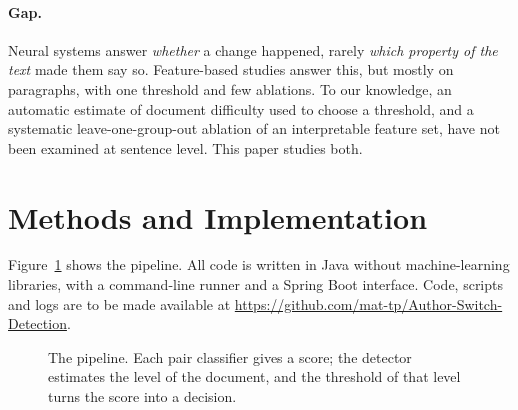 \documentclass[runningheads]{llncs}
\begin{document}
\paragraph{Gap.} Neural systems answer \emph{whether} a change happened, rarely \emph{which property of the text} made them say so. Feature-based studies answer this, but mostly on paragraphs, with one threshold and few ablations. To our knowledge, an automatic estimate of document difficulty used to choose a threshold, and a systematic leave-one-group-out ablation of an interpretable feature set, have not been examined at sentence level. This paper studies both.

\section{Methods and Implementation}
\label{sec:methods}

Figure~\ref{fig:pipeline} shows the pipeline. All code is written in Java without machine-learning libraries, with a command-line runner and a Spring Boot interface. Code, scripts and logs are to be made available at \url{https://github.com/mat-tp/Author-Switch-Detection}.

\begin{figure}[t]
\centering
{}
\caption{The pipeline. Each pair classifier gives a score; the detector estimates the level of the document, and the threshold of that level turns the score into a decision.}
\label{fig:pipeline}
\end{figure}
\end{document}
